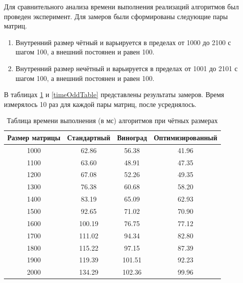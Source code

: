 \documentclass[12pt]{report}
\begin{document}
Для сравнительного анализа времени выполнения реализаций алгоритмов был проведен эксперимент. Для замеров были сформированы следующие пары матриц.
\begin{enumerate}
	\item Внутренний размер чётный и варьируется в пределах от 1000 до 2100 с шагом 100, а внешний постоянен и равен 100.
	\item Внутренний размер нечётный и варьируется в пределах от 1001 до 2101 с шагом 100, а внешний постоянен и равен 100.
\end{enumerate}

В таблицах \ref{timeEvenTable} и \ref{timeOddTable} представлены результаты замеров. Время измерялось 10 раз для каждой пары матриц, после усреднялось. 

\begin{table} [h!]
	\caption{Таблица времени выполнения (в мс) алгоритмов при чётных размерах}
	\begin{center}
		\begin{tabular}{|c c c c|} 
		\hline
		Размер матрицы & Стандартный & Виноград & Оптимизированный \\  
		\hline
        1000 & 62.86 & 56.38 & 41.96  \\ 
        \hline
        1100 & 63.60 & 48.91 & 47.35  \\ 
        \hline
        1200 & 67.08 & 52.26 & 49.35  \\ 
        \hline
        1300 & 76.38 & 60.68 & 58.20  \\ 
        \hline
        1400 & 83.19 & 65.09 & 62.93  \\ 
        \hline
        1500 & 92.65 & 71.02 & 70.90  \\ 
        \hline
        1600 & 100.19 & 76.75 & 77.12  \\ 
        \hline
        1700 & 111.02 & 94.34 & 82.80  \\ 
        \hline
        1800 & 115.22 & 97.15 & 87.39  \\ 
        \hline
        1900 & 119.39 & 101.51 & 92.23  \\ 
        \hline
        2000 & 134.29 & 102.36 & 99.96  \\ 
        \hline
		\end{tabular}
	\label{timeEvenTable}
	\end{center}
\end{table}
\end{document}
